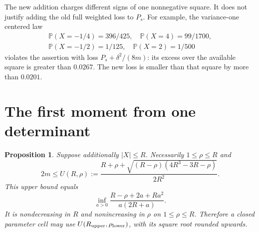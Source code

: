 \documentclass[11pt,a4paper]{article}
\newtheorem{theorem}{Proposition}
\newcommand{\Pp}{\mathbb P}
\begin{document}
The new addition charges different signs of one nonnegative square.
It does not justify adding the old full weighted loss to $P_s$.
For example, the variance-one centered law
\begin{gather*}
 \Pp(X=-1/4)=396/425,\quad\Pp(X=4)=99/1700,\\
 \Pp(X=-1/2)=1/125,\quad\Pp(X=2)=1/500
\end{gather*}
violates the assertion with loss $P_s+\delta^2/(8m)$: its excess
over the available square is greater than $0.0267$. The new loss is
smaller than that square by more than $0.0201$.

\section{The first moment from one determinant}
\begin{theorem}\label{v10:primitive:first}
Suppose additionally $|X|\le R$. Necessarily $1\le\rho\le R$ and
\begin{equation}\label{v10:primitive:root}
 2m\le U(R,\rho):=
 \frac{R+\rho+\sqrt{(R-\rho)(4R^3-3R-\rho)}}{2R^2}.
\end{equation}
This upper bound equals
\begin{equation}\label{v10:primitive:inf}
 \inf_{a>0}\frac{R-\rho+2a+Ra^2}{a(2R+a)}.
\end{equation}
It is nondecreasing in $R$ and nonincreasing in $\rho$ on
$1\le\rho\le R$. Therefore a closed parameter cell may use
$U(R_{\rm upper},\rho_{\rm lower})$, with its square root rounded upwards.
\end{theorem}
\end{document}
